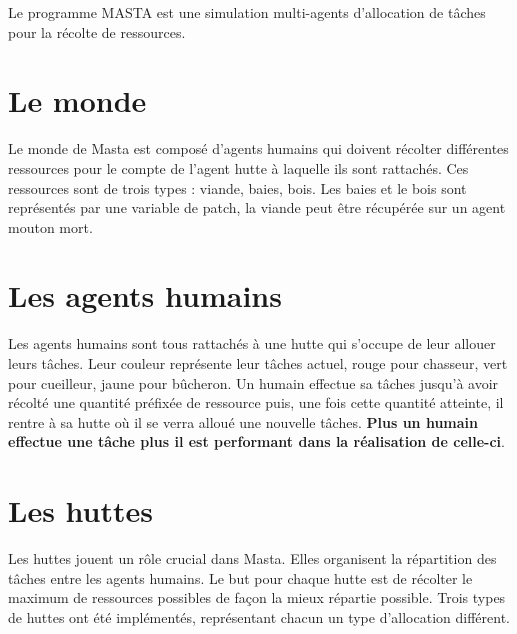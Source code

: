 
Le programme MASTA est une simulation multi-agents d'allocation de
tâches pour la récolte de ressources. 

\section{Le monde}

Le monde de Masta est composé d'agents humains qui doivent récolter
différentes ressources pour le compte de l'agent hutte à laquelle ils sont
rattachés. Ces ressources sont de trois types : viande, baies,
bois. Les baies et le bois sont représentés par une variable
de \og{}patch\fg{}, la viande peut être récupérée sur un agent mouton mort. 


\section{Les agents humains}

Les agents humains sont tous rattachés à une hutte qui s'occupe de
leur allouer leurs tâches. Leur couleur représente leur tâches actuel,
rouge pour chasseur, vert pour cueilleur, jaune pour bûcheron. Un
humain effectue sa tâches jusqu'à avoir récolté une quantité préfixée
de ressource puis, une fois cette quantité atteinte, il rentre à sa
hutte où il se verra alloué une nouvelle tâches. {\bf Plus un
humain effectue une tâche plus il est performant dans la réalisation de
celle-ci}.

\section{Les huttes}

Les huttes jouent un rôle crucial dans Masta. Elles organisent la
répartition des tâches entre les agents humains. Le but pour
chaque hutte est de récolter le maximum de ressources possibles de
façon la mieux répartie possible. Trois types de huttes ont été
implémentés, représentant chacun un type d'allocation différent.

